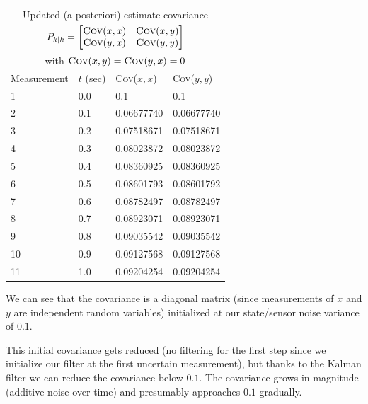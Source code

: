 \begin{center}
    \begin{tabular}{ |p{2.5cm}||p{2.5cm}|p{4cm}|p{4cm}|  }
        \hline
        \multicolumn{4}{|c|}{Updated (a posteriori) estimate covariance} \\
        \multicolumn{4}{|c|}{$P_{k\mid k} = \begin{bmatrix}
            \textsc{Cov}(x,x) & \textsc{Cov}(x,y) \\
            \textsc{Cov}(y,x) & \textsc{Cov}(y,y)
            \end{bmatrix} $}\\
        \multicolumn{4}{|c|}{with $\textsc{Cov}(x,y)=\textsc{Cov}(y,x)=0$}\\

        \hline
        Measurement& $t$ (sec) & \textsc{Cov}($x,x$) & \textsc{Cov}($y,y$) \\
        \hline
        1   & 0.0  & 0.1 & 0.1 \\
        2  & 0.1   & 0.06677740 & 0.06677740 \\
        3 & 0.2    & 0.07518671 & 0.07518671 \\
        4  & 0.3   & 0.08023872 & 0.08023872 \\
        5 & 0.4    & 0.08360925 & 0.08360925 \\
        6 & 0.5    & 0.08601793 & 0.08601792 \\
        7 &  0.6   & 0.08782497 & 0.08782497 \\
        8 &  0.7   & 0.08923071 & 0.08923071 \\
        9 &  0.8   & 0.09035542 & 0.09035542 \\
        10 & 0.9   & 0.09127568 & 0.09127568 \\
        11 & 1.0   & 0.09204254 & 0.09204254 \\
        \hline  
       \end{tabular}  
\end{center}

We can see that the covariance is a diagonal matrix (since measurements of $x$ and $y$ are independent random variables) initialized at our state/sensor noise variance of $0.1$. 

This initial covariance gets reduced (no filtering for the first step since we initialize our filter at the first uncertain measurement), 
but thanks to the Kalman filter we can reduce the covariance below $0.1$. The covariance grows in magnitude (additive noise over time) and presumably approaches $0.1$ gradually.